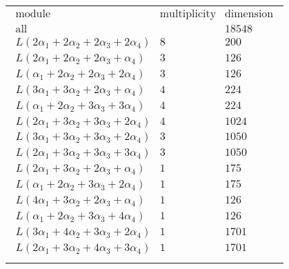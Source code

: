 \documentclass[crop,border=2mm]{standalone}
\begin{document}
\begin{tabular}{l}
$\displaystyle
\begin{array}{rll}
	\text{module}&\text{multiplicity}&\text{dimension} \\ \hline \text{all}&&18548 \\
	L\left( 2\alpha_{1}+ 2\alpha_{2}+ 2\alpha_{3}+ 2\alpha_{4}\right)&8&200\\
	L\left( 2\alpha_{1}+ 2\alpha_{2}+ 2\alpha_{3}+\alpha_{4}\right)&3&126\\
	L\left(\alpha_{1}+ 2\alpha_{2}+ 2\alpha_{3}+ 2\alpha_{4}\right)&3&126\\
	L\left( 3\alpha_{1}+ 3\alpha_{2}+ 2\alpha_{3}+\alpha_{4}\right)&4&224\\
	L\left(\alpha_{1}+ 2\alpha_{2}+ 3\alpha_{3}+ 3\alpha_{4}\right)&4&224\\
	L\left( 2\alpha_{1}+ 3\alpha_{2}+ 3\alpha_{3}+ 2\alpha_{4}\right)&4&1024\\
	L\left( 3\alpha_{1}+ 3\alpha_{2}+ 3\alpha_{3}+ 2\alpha_{4}\right)&3&1050\\
	L\left( 2\alpha_{1}+ 3\alpha_{2}+ 3\alpha_{3}+ 3\alpha_{4}\right)&3&1050\\
	L\left( 2\alpha_{1}+ 3\alpha_{2}+ 2\alpha_{3}+\alpha_{4}\right)&1&175\\
	L\left(\alpha_{1}+ 2\alpha_{2}+ 3\alpha_{3}+ 2\alpha_{4}\right)&1&175\\
	L\left( 4\alpha_{1}+ 3\alpha_{2}+ 2\alpha_{3}+\alpha_{4}\right)&1&126\\
	L\left(\alpha_{1}+ 2\alpha_{2}+ 3\alpha_{3}+ 4\alpha_{4}\right)&1&126\\
	L\left( 3\alpha_{1}+ 4\alpha_{2}+ 3\alpha_{3}+ 2\alpha_{4}\right)&1&1701\\
	L\left( 2\alpha_{1}+ 3\alpha_{2}+ 4\alpha_{3}+ 3\alpha_{4}\right)&1&1701
\end{array}
$ \\ \\

\end{tabular}
\end{document}
